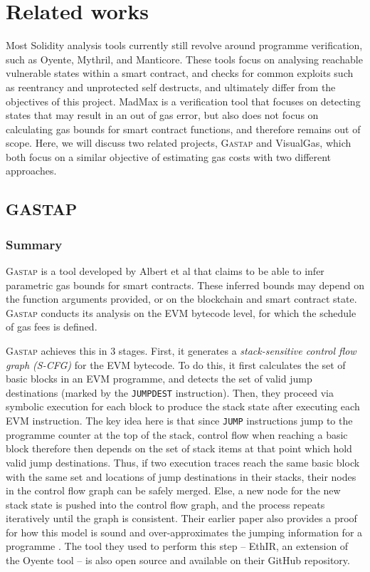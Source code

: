 \chapter{Related works}
\label{chap:related}

Most Solidity analysis tools currently still revolve around programme verification, such 
as Oyente, Mythril, and Manticore. These tools focus on analysing reachable vulnerable
states within a smart contract, and checks for common exploits such as reentrancy and unprotected
self destructs, and ultimately differ from the objectives of this project. MadMax is a
verification tool that focuses on detecting states that may result in an out of gas error, but
also does not focus on calculating gas bounds for smart contract functions, and therefore
remains out of scope. Here, we will discuss two related projects, \textsc{Gastap} and VisualGas, which
both focus on a similar objective of estimating gas costs with two different approaches.

\section{GASTAP}

\subsection{Summary}

\textsc{Gastap} is a tool developed by Albert et al \cite{dontrunonfumes} that claims to be able to
infer parametric gas bounds for smart contracts. These inferred bounds may depend on the
function arguments provided, or on the blockchain and smart contract state. \textsc{Gastap} conducts
its analysis on the EVM bytecode level, for which the schedule of gas fees is defined.

\textsc{Gastap} achieves this in 3 stages. First, it generates a \textit{stack-sensitive control flow graph (S-CFG)}
for the EVM bytecode. To do this, it first calculates the set of basic blocks in an EVM programme,
and detects the set of valid jump destinations (marked by the \texttt{JUMPDEST} instruction). Then,
they proceed via symbolic execution for each block to produce the stack state after executing each EVM instruction.
The key idea here is that since \texttt{JUMP} instructions jump to the programme counter at the 
top of the stack, control flow when reaching a basic block therefore then depends on the set 
of stack items at that point which hold valid jump destinations. Thus, if two execution traces
reach the same basic block with the same set and locations of jump destinations in their stacks, 
their nodes in the control flow graph can be safely merged. Else, a new node for the new stack
state is pushed into the control flow graph, and the process repeats iteratively until the graph
is consistent. Their earlier paper also provides a proof for how this model is sound and over-approximates 
the jumping information for a programme \cite{constructcfg}. The tool they used to perform this step -- 
EthIR, an extension of the Oyente tool -- is also open source and available on their GitHub repository.

